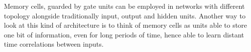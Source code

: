 Memory cells, guarded by gate units can be employed in networks with different topology alongside traditionally 
input, output and hidden units. Another way to look at this kind of architecture is to think of memory cells as units 
able to store one bit of information, even for long periods of time, hence able to learn distant time correlations 
between inputs.







